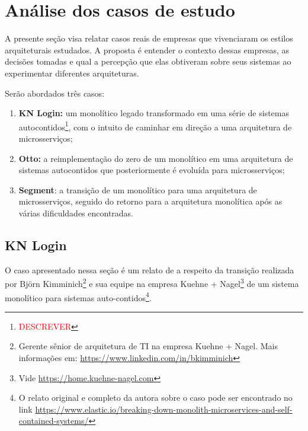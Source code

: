 
\section{Análise dos casos de estudo}

A presente seção visa relatar casos reais de empresas que vivenciaram os estilos arquiteturais
estudados. A proposta é entender o contexto dessas empresas, as decisões tomadas e qual a percepção
que elas obtiveram sobre seus sistemas ao experimentar diferentes arquiteturas.

Serão abordados três casos:

\begin{enumerate}
    \item \textbf{KN Login:} um monolítico legado transformado em uma série de sistemas
        autocontidos\footnote{\textcolor{red}{DESCREVER}}, com o
        intuito de caminhar em direção a uma arquitetura de microsserviços;
    \item \textbf{Otto:} a reimplementação do zero de um monolítico em uma arquitetura de sistemas
        autocontidos que posteriormente é evoluída para microsserviços;
    \item \textbf{Segment}: a transição de um monolítico para uma arquitetura de microsserviços,
        seguido do retorno para a arquitetura monolítica após as várias dificuldades encontradas.
\end{enumerate}

\subsection{KN Login}
\label{sec:KNLogin}

O caso apresentado nessa seção é um relato de  a respeito
da transição realizada por Björn Kimminich\footnote{Gerente sênior de arquitetura de TI na empresa
Kuehne + Nagel. Mais informações em: \url{https://www.linkedin.com/in/bkimminich}} e sua equipe na empresa
Kuehne + Nagel\footnote{Vide \url{https://home.kuehne-nagel.com}} de um sistema monolítico para sistemas
auto-contidos\footnote{O relato original e completo da autora sobre o caso pode ser encontrado no link
\url{https://www.elastic.io/breaking-down-monolith-microservices-and-self-contained-systems/}}. 

